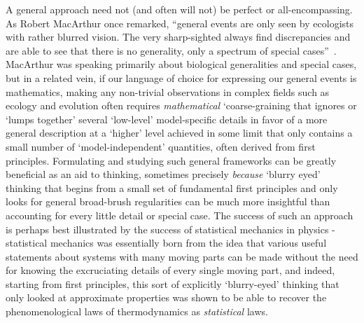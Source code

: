 A general approach need not (and often will not) be perfect or all-encompassing. As Robert MacArthur once remarked, ``general events are only seen by ecologists with rather blurred vision. The very sharp-sighted always find discrepancies and are able to see that there is no generality, only a spectrum of special cases”~\citep{kingsland_modeling_1985}. MacArthur was speaking primarily about biological generalities and special cases, but in a related vein, if our language of choice for expressing our general events is mathematics, making any non-trivial observations in complex fields such as ecology and evolution often requires \emph{mathematical} `coarse-graining that ignores or `lumps together' several `low-level' model-specific details in favor of a more general description at a `higher' level achieved in some limit that only contains a small number of `model-independent' quantities, often derived from first principles. Formulating and studying such general frameworks can be greatly beneficial as an aid to thinking, sometimes precisely \emph{because} `blurry eyed' thinking that begins from a small set of fundamental first principles and only looks for general broad-brush regularities can be much more insightful than accounting for every little detail or special case. The success of such an approach is perhaps best illustrated by the success of statistical mechanics in physics - statistical mechanics was essentially born from the idea that various useful statements about systems with many moving parts can be made without the need for knowing the excruciating details of every single moving part, and indeed, starting from first principles, this sort of explicitly `blurry-eyed' thinking that only looked at approximate properties was shown to be able to recover the phenomenological laws of thermodynamics as \emph{statistical} laws.

